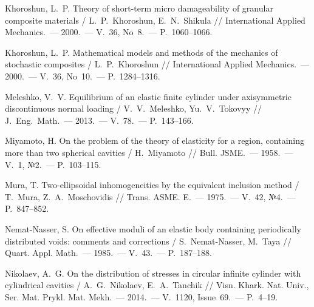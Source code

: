\begin{russian}
\begin{biblist}{99}
Khoroshun, L.~P. 
Theory of short-term micro damageability of granular composite materials
/ L.~P.~Khoroshun, E.~N.~Shikula 
// International Applied Mechanics.~--- 2000.~--- V.~36, No~8.~--- P.~1060--1066.

Khoroshun, L.~P. 
Mathematical models and methods of the mechanics of stochastic composites 
/ L.~P.~Khoroshun 
// International Applied Mechanics.~--- 2000.~--- V.~36, No~10.~--- P.~1284--1316.

Meleshko, V.~V. 
Equilibrium of an elastic finite cylinder under axisymmetric discontinuous normal loading 
/ V.~V.~Meleshko, Yu.~V.~Tokovyy 
// J.~Eng.~Math.~--- 2013.~--- V.~78.~--- P.~143--166.  

Miyamoto, H. 
On the problem of the theory of elasticity for a region, containing more than two spherical cavities 
/ H.~Miyamoto 
// Bull. JSME.~--- 1958.~--- V.~1, №2.~--- P.~103--115.

Mura, T. 
Two-ellipsoidal inhomogeneities by the equivalent inclusion method 
/ T.~Mura, Z.~A.~Moschovidis 
// Trans. ASME. E.~--- 1975.~--- V.~42, №4.~--- P.~847--852.

Nemat-Nasser, S. 
On effective moduli of an elastic body containing periodically distributed voids: comments and corrections  
/ S.~Nemat-Nasser, M.~Taya 
// Quart. Appl. Math.~--- 1985.~--- V.~43.~--- P.~187--188.

Nikolaev, A.~G. 
On the distribution of stresses in circular infinite cylinder with cylindrical cavities 
/ A.~G.~Nikolaev, E.~A.~Tanchik 
// Visn. Khark. Nat. Univ., Ser. Mat. Prykl. Mat. Mekh.~--- 2014.~--- V.~1120, Issue~69.~--- P.~4--19.





\end{biblist}
\end{russian}
